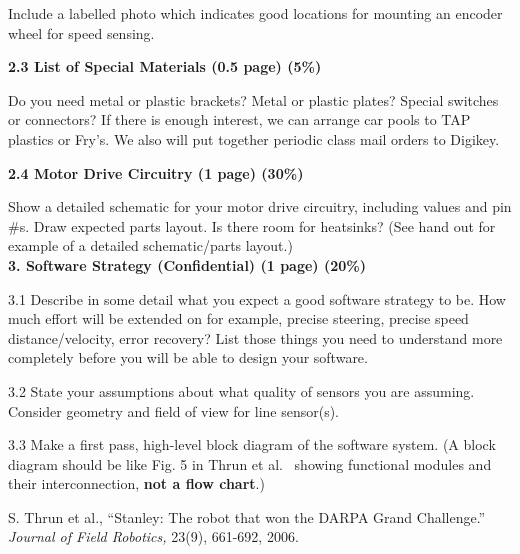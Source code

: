 \documentclass[10pt]{article}
\begin{document}
Include a labelled photo which indicates good locations for mounting
an encoder wheel for speed sensing.


{\bf 2.3 List of Special Materials (0.5 page) (5\%)}

Do you need metal or plastic
brackets? Metal or plastic plates?  Special switches or connectors? If
there is enough interest, we can arrange car pools to TAP plastics or
Fry's. We also will put together periodic class mail orders to Digikey.

{\bf 2.4 Motor Drive Circuitry (1 page) (30\%)}

Show a detailed schematic for your motor drive circuitry, including values and
pin \#s.
Draw expected parts layout. Is there room for heatsinks?
(See hand out for example of a detailed schematic/parts layout.)\\

{\bf 3. Software Strategy (Confidential) (1 page) (20\%)}


3.1 Describe in some detail what you expect a good software strategy to be.
How much effort will be extended on for example, precise steering,
precise speed distance/velocity, error recovery? List those things you need
to understand more completely before you will be able to design
your software. 

3.2 State your assumptions about what quality of sensors
you are assuming. Consider geometry and field of view for line sensor(s).

3.3 Make a first pass, high-level block diagram of
the software system. (A block diagram should be like Fig. 5
in Thrun et al.~\cite{Thrun06} showing
functional modules and their interconnection, {\bf not a flow chart}.) 

\begin{small}

\begin{thebibliography}{10}
{
S. Thrun et al.,
``Stanley: The robot that won the DARPA Grand Challenge.''
{\em Journal of Field Robotics,} 23(9), 661-692, 2006.
}
\end{thebibliography}
\end{small} 
\end{document}
